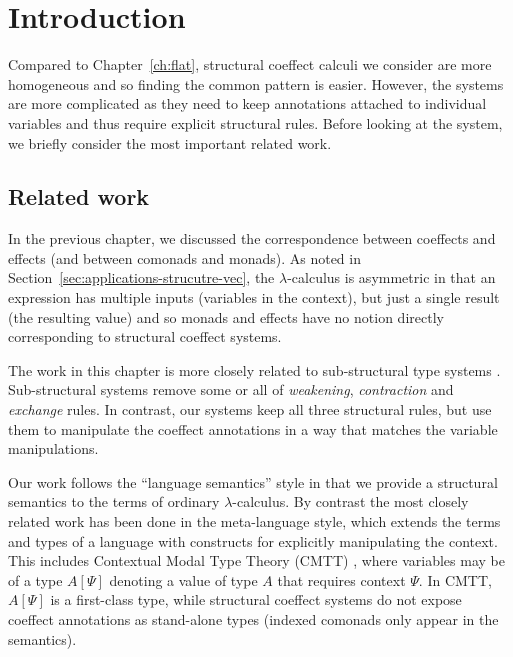 \section{Introduction}
\label{sec:structural-intro}

Compared to Chapter~\ref{ch:flat}, structural coeffect calculi we consider are more homogeneous and
so finding the common pattern is easier. However, the systems are more complicated as they need to
keep annotations attached to individual variables and thus require explicit structural rules. Before
looking at the system, we briefly consider the most important related work.


\subsection{Related work}

In the previous chapter, we discussed the correspondence between coeffects and effects (and
between comonads and monads). As noted in Section~\ref{sec:applications-strucutre-vec}, the
$\lambda$-calculus is asymmetric in that an expression has multiple inputs (variables in the
context), but just a single result (the resulting value) and so monads and effects have no notion
directly corresponding to structural coeffect systems.

The work in this chapter is more closely related to sub-structural type systems \cite{substruct-attpl-intro}.
Sub-structural systems remove some or all of \emph{weakening}, \emph{contraction} and
\emph{exchange} rules. In contrast, our systems keep all three structural rules, but use them to
manipulate the coeffect annotations in a way that matches the variable manipulations.

Our work follows the ``language semantics'' style in that we provide a structural semantics to
the terms of ordinary $\lambda$-calculus. By contrast the most closely related work has been done in
the meta-language style, which extends the terms and types of a language with constructs for explicitly
manipulating the context. This includes Contextual Modal Type Theory (CMTT) \cite{logic-cmtt}, where variables
may be of a type $A[\Psi]$ denoting a value of type $A$ that requires context $\Psi$. In CMTT,
$A[\Psi]$ is a first-class type, while structural coeffect systems do not expose coeffect
annotations as stand-alone types (indexed comonads only appear in the semantics).

